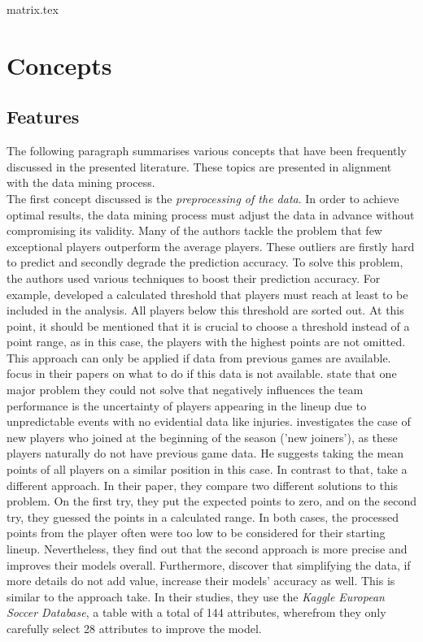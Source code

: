 {matrix.tex}

\section{Concepts}
\subsection{Features}

The following paragraph summarises various concepts that have been frequently discussed in the presented literature. These topics are presented in alignment with the data mining process.  \\
\indent The first concept discussed is the \emph{preprocessing of the data}. In order to achieve optimal results, the data mining process must adjust the data in advance without compromising its validity. Many of the authors tackle the problem that few exceptional players outperform the average players. These outliers are firstly hard to predict and secondly degrade the prediction accuracy. To solve this problem, the authors used various techniques to boost their prediction accuracy. For example, \citet{landers_machine_2017} developed a calculated threshold that players must reach at least to be included in the analysis. All players below this threshold are sorted out. At this point, it should be mentioned that it is crucial to choose a threshold instead of a point range, as in this case, the players with the highest points are not omitted. This approach can only be applied if data from previous games are available. \citet{lutz_fantasy_2015,egidi_bayesian_2018,yurko_nflwar_2019} focus in their papers on what to do if this data is not available. \citet{yurko_nflwar_2019} state that one major problem they could not solve that negatively influences the team performance is the uncertainty of players appearing in the lineup due to unpredictable events with no evidential data like injuries. \citet{lutz_fantasy_2015} investigates the case of new players who joined at the beginning of the season ('new joiners'), as these players naturally do not have previous game data. He suggests taking the mean points of all players on a similar position in this case. \parencite[cf.][, p. 3]{lutz_fantasy_2015} In contrast to that, \citet{egidi_bayesian_2018} take a different approach. In their paper, they compare two different solutions to this problem. On the first try, they put the expected points to zero, and on the second try, they guessed the points in a calculated range. In both cases, the processed points from the player often were too low to be considered for their starting lineup. Nevertheless, they find out that the second approach is more precise and improves their models overall. Furthermore, \citet{egidi_bayesian_2018} discover that simplifying the data, if more details do not add value, increase their models' accuracy as well. This is similar to the approach \citet{deng_analysis_2020} take. In their studies, they use the \emph{Kaggle European Soccer Database}, a table with a total of 144 attributes, wherefrom they only carefully select 28 attributes to improve the model. \\
